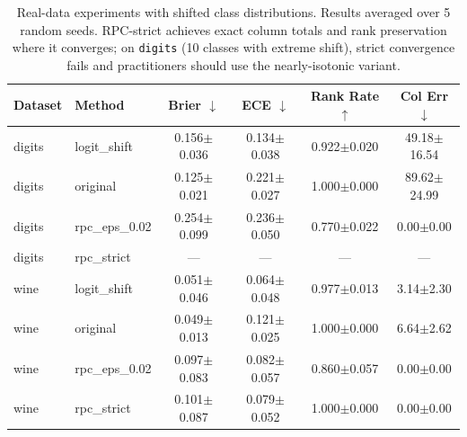 \begin{table}[t]
\centering
\small
\caption{Real-data experiments with shifted class distributions. Results averaged over 5 random seeds. RPC-strict achieves exact column totals and rank preservation where it converges; on \texttt{digits} (10 classes with extreme shift), strict convergence fails and practitioners should use the nearly-isotonic variant.}
\label{tab:realdata}
\begin{tabular}{llcccc}
\toprule
Dataset & Method & Brier $\downarrow$ & ECE $\downarrow$ & Rank Rate $\uparrow$ & Col Err $\downarrow$ \\
\midrule
digits & logit\_shift & 0.156$\pm$0.036 & 0.134$\pm$0.038 & 0.922$\pm$0.020 & 49.18$\pm$16.54 \\
digits & original & 0.125$\pm$0.021 & 0.221$\pm$0.027 & 1.000$\pm$0.000 & 89.62$\pm$24.99 \\
digits & rpc\_eps\_0.02 & 0.254$\pm$0.099 & 0.236$\pm$0.050 & 0.770$\pm$0.022 & 0.00$\pm$0.00 \\
digits & rpc\_strict & --- & --- & --- & --- \\
\midrule
wine & logit\_shift & 0.051$\pm$0.046 & 0.064$\pm$0.048 & 0.977$\pm$0.013 & 3.14$\pm$2.30 \\
wine & original & 0.049$\pm$0.013 & 0.121$\pm$0.025 & 1.000$\pm$0.000 & 6.64$\pm$2.62 \\
wine & rpc\_eps\_0.02 & 0.097$\pm$0.083 & 0.082$\pm$0.057 & 0.860$\pm$0.057 & 0.00$\pm$0.00 \\
wine & rpc\_strict & 0.101$\pm$0.087 & 0.079$\pm$0.052 & 1.000$\pm$0.000 & 0.00$\pm$0.00 \\
\bottomrule
\end{tabular}
\end{table}
